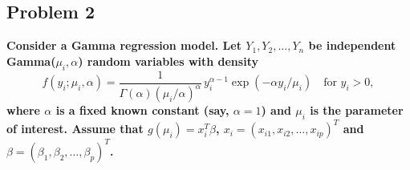 \subsection{Problem 2}

\textbf{Consider a Gamma regression model. Let $Y_1,Y_2,\ldots,Y_n$ be independent Gamma($\mu_i,\alpha$) random variables with density}
\[
f(y_i;\mu_i,\alpha) = \frac{1}{\Gamma(\alpha)(\mu_i/\alpha)^\alpha}\, y_i^{\alpha-1}\exp(-\alpha y_i/\mu_i) \quad \text{for } y_i > 0,
\]
\textbf{where $\alpha$ is a fixed known constant (say, $\alpha=1$) and $\mu_i$ is the parameter of interest. Assume that $g(\mu_i) = x_i^T\beta$, $x_i = (x_{i1},x_{i2},\ldots,x_{ip})^T$ and $\beta = (\beta_1,\beta_2,\ldots,\beta_p)^T$.}

